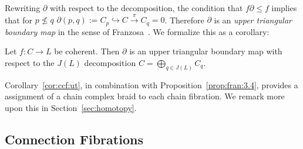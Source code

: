  
 
 
 Rewriting $\partial$ with respect to the decomposition, the condition that $f\partial \leq f$ implies that for $p\not\leq q$ $\partial(p,q):=C_p\hookrightarrow C \xrightarrow{\pi} C_q =0$.   Therefore $\partial$ is an {\em upper triangular boundary map} in the sense of Franzosa~\cite[Definition 3.1]{fran}.   We formalize this as a corollary:


 
 
 
 \begin{cor}\label{cor:ccf:ut}
 Let $f:C\to L$ be coherent.  Then $\partial$ is an upper triangular boundary map with respect to the $J(L)$ decomposition $C=\bigoplus_{q\in J(L)}C_q$.
 \end{cor}

%
%
%
%
%

Corollary~\ref{cor:ccf:ut}, in combination with Proposition~\ref{prop:fran:3.4}, provides a assignment of a chain complex braid to each chain fibration.  We remark more upon this in Section~\ref{sec:homotopy}.


\subsection{Connection Fibrations}

